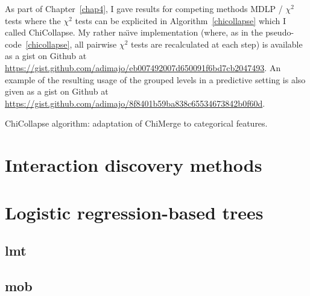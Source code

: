As part of Chapter~\ref{chap4}, I gave results for competing methods MDLP / $\chi^2$ tests where the $\chi^2$ tests can be explicited in Algorithm~\ref{chicollapse} which I called ChiCollapse. My rather na{\"\i}ve implementation (where, as in the pseudo-code~\ref{chicollapse}, all pairwise $\chi^2$ tests are recalculated at each step) is available as a gist on Github at \url{https://gist.github.com/adimajo/eb007492007d650091f6bd7cb2047493}. An example of the resulting usage of the grouped levels in a predictive setting is also given as a gist on Github at \url{https://gist.github.com/adimajo/8f8401b59ba838c65534673842b0f60d}.

\begin{algorithm}[H]
 \KwResult{$\hat{\q}$}
 \caption{\label{chicollapse} ChiCollapse algorithm: adaptation of ChiMerge to categorical features.}
\end{algorithm}


\section{Interaction discovery methods}



\section{Logistic regression-based trees}


\subsection{\Gls{lmt}}


\subsection{\Gls{mob}}




\printbibliography[heading=subbibliography, title=References of Appendix A]